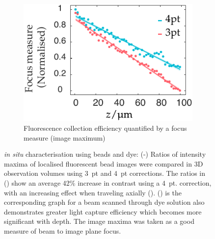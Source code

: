 \begin{figure}
\begin{subfigure}[t]{0.45\textwidth}
        \centering
        \includegraphics{in_situ/axial_travel_thesis}
        \caption{Fluorescence collection efficiency quantified by a focus measure (image maximum)}
        \label{fig:in_situ/axial_travel_thesis}
    \end{subfigure}
    \caption[\emph{in situ} characterisation using beads and dye]{\emph{in situ} characterisation using beads and dye:
    (-) Ratios of intensity maxima of localised fluorescent bead images
    were compared in \gls{3D} observation volumes %
    using 3~pt and 4~pt corrections.
    The ratios in () show an %
    average 42\% increase in contrast using a 4~pt. correction, %
    with an increasing effect when traveling axially ().
    () is the corresponding graph for a beam scanned through dye solution also demonstrates greater light capture efficiency which becomes more significant with depth.
    The image maxima was taken as a good measure of beam to image plane focus.
    }
    \label{fig:in_situ}
\end{figure}

